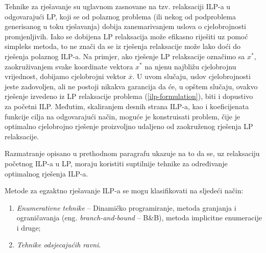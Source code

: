 \documentclass[a4paper, utf8, 11pt, colorlinks]{book}
\theoremstyle{definition}
\begin{document}
Tehnike za rješavanje su uglavnom zasnovane na tzv. relaksaciji ILP-a u odgovarajući LP, koji se od polaznog problema (ili nekog od podproblema generisanog u toku rješavanja) dobija zanemarivanjem uslova o cjelobrojnosti promjenljivih.  Iako se dobijena  LP relaksacija može efikasno riješiti uz pomoć simpleks metoda, to ne znači da se iz rješenja relaksacije može lako doći do rješenja polaznog ILP-a. Na primjer, ako rješenje LP relaksacije označimo sa $x^*$, zaokruživanjem svake koordinate vektora $x^*$ na njenu najbližu cjelobrojnu vrijednost, dobijamo cjelobrojni vektor  $\overline{x}$.  U uvom slučaju, uslov cjelobrojnosti jeste zadovoljen, ali ne postoji nikakva garancija da će, u opštem slučaju,  ovakvo rješenje izvedeno iz LP relaksacije problema (\ref{ilp-formulation}), biti i  dopustivo za početni ILP. Međutim, skaliranjem desnih strana ILP-a, kao i koeficijenata funkcije cilja na odgovarajući način, moguće je konstruisati problem, čije je optimalno cjelobrojno rješenje proizvoljno udaljeno od zaokruženog rješenja LP relaksacije. 
 
 Razmatranje opisano u prethodnom paragrafu ukazuje na to da se, uz relaksaciju početnog ILP-a u LP, moraju koristiti suptilnije tehnike za određivanje optimalnog rješenja ILP-a. 
 
Metode za egzaktno rješavanje ILP-a se mogu klasifikovati na sljedeći način:
 \begin{enumerate}
     \item \emph{Enumerativne tehnike} -- Dinamičko programiranje, metoda granjanja i ograničavanja (eng. \emph{branch-and-bound} -- B\&B), metoda implicitne enumeracije i druge;
     \item \emph{Tehnike odsjecajućih ravni}.
 \end{enumerate}
\end{document}
